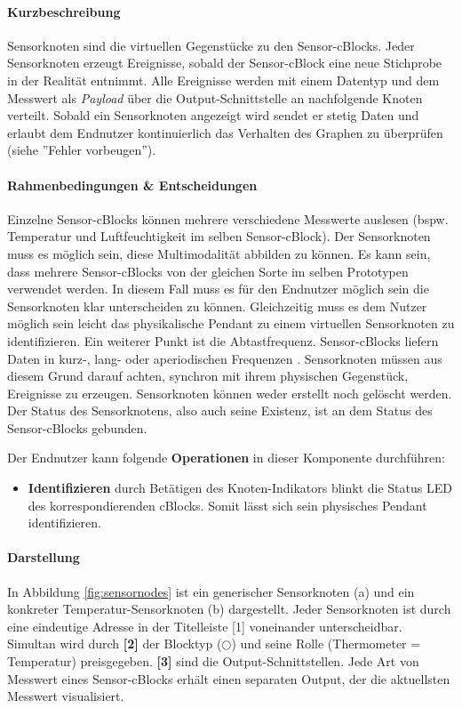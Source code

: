 \paragraph{Kurzbeschreibung}  Sensorknoten sind die virtuellen Gegenstücke zu den Sensor-cBlocks. Jeder Sensorknoten erzeugt Ereignisse, sobald der Sensor-cBlock eine neue Stichprobe in der Realität entnimmt. Alle Ereignisse werden mit einem Datentyp und dem Messwert als \textit{Payload} über die Output-Schnittstelle an nachfolgende Knoten verteilt. Sobald ein Sensorknoten angezeigt wird sendet er stetig Daten und erlaubt dem Endnutzer kontinuierlich das Verhalten des Graphen zu überprüfen (siehe ''Fehler vorbeugen'').

\paragraph{Rahmenbedingungen \& Entscheidungen} Einzelne Sensor-cBlocks können mehrere verschiedene Messwerte auslesen (bspw. Temperatur und Luftfeuchtigkeit im selben Sensor-cBlock). Der Sensorknoten muss es möglich sein, diese Multimodalität abbilden zu können. Es kann sein, dass mehrere Sensor-cBlocks von der gleichen Sorte im selben Prototypen verwendet werden. In diesem Fall muss es für den Endnutzer möglich sein die Sensorknoten klar unterscheiden zu können. Gleichzeitig muss es dem Nutzer möglich sein leicht das  physikalische Pendant zu einem virtuellen Sensorknoten zu identifizieren. Ein weiterer Punkt ist die Abtastfrequenz. Sensor-cBlocks liefern Daten in kurz-, lang- oder aperiodischen Frequenzen . Sensorknoten müssen aus diesem Grund darauf achten, synchron mit ihrem physischen Gegenstück, Ereignisse zu erzeugen. Sensorknoten können weder erstellt noch gelöscht werden. Der Status des Sensorknotens, also auch seine Existenz, ist an dem Status des Sensor-cBlocks gebunden.

Der Endnutzer kann folgende \textbf{Operationen} in dieser Komponente durchführen: 
\begin{itemize}
    \item \textbf{Identifizieren} durch Betätigen des Knoten-Indikators blinkt die Status LED des korrespondierenden cBlocks. Somit lässt sich sein physisches Pendant identifizieren.
\end{itemize}
\paragraph{Darstellung} In Abbildung \ref{fig:sensornodes} ist ein generischer Sensorknoten (a) und ein konkreter Temperatur-Sensorknoten (b) dargestellt. Jeder Sensorknoten ist durch eine eindeutige Adresse in der Titelleiste [1] voneinander unterscheidbar. Simultan wird durch \textbf{[2]} der Blocktyp ($\bigcirc$) und seine Rolle (Thermometer = Temperatur) preisgegeben. \textbf{[3]} sind die Output-Schnittstellen. Jede Art von Messwert eines Sensor-cBlocks erhält einen separaten Output, der die aktuellsten Messwert visualisiert. 

